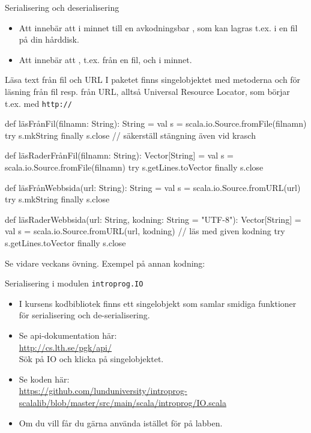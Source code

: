 


\begin{Slide}{Serialisering och deserialisering}
\begin{itemize}
  \item Att  innebär att  i minnet till en avkodningsbar , som kan lagras t.ex. i en fil på din hårddisk.
  \item Att  innebär att , t.ex. från en fil, och  i minnet.
\end{itemize}
\end{Slide}


\begin{Slide}{Läsa text från fil och URL}\SlideFontSmall
I paketet  finns singelobjektet  med metoderna  och  för läsning från fil resp. från  URL, alltså Universal Resource Locator, som börjar t.ex. med \texttt{http://}
\begin{Code}
def läsFrånFil(filnamn: String): String = 
  val s = scala.io.Source.fromFile(filnamn)
  try s.mkString finally s.close // säkerställ stängning även vid krasch

def läsRaderFrånFil(filnamn: String): Vector[String] =
  val s = scala.io.Source.fromFile(filnamn)
  try s.getLines.toVector finally s.close 

def läsFrånWebbsida(url: String): String = 
  val s = scala.io.Source.fromURL(url)
  try s.mkString finally s.close

def läsRaderWebbsida(url: String, kodning: String = "UTF-8"): Vector[String] =
  val s = scala.io.Source.fromURL(url, kodning)  // läs med given kodning
  try s.getLines.toVector finally s.close 

\end{Code}
Se vidare veckans övning. Exempel på annan kodning: 
\end{Slide}


\begin{Slide}{Serialisering i modulen \texttt{introprog.IO}}
  \begin{itemize}
    \item I kursens kodbibliotek  finns ett singelobjekt  som samlar smidiga funktioner för serialisering och de-serialisering. 
    \item Se api-dokumentation här: \\ \url{http://cs.lth.se/pgk/api/} \\ Sök på IO och klicka på singelobjektet.
    \item Se koden här:\\
    \url{https://github.com/lunduniversity/introprog-scalalib/blob/master/src/main/scala/introprog/IO.scala}
    \item Om du vill får du gärna använda  istället för  på labben.  
  \end{itemize}
\end{Slide}
